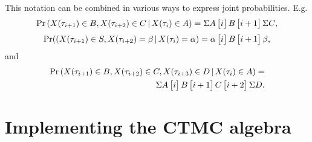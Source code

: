 This notation can be combined in various ways to express joint probabilities. E.g.
\[
    \Pr\left( X(\tau_{i+1})\in B, X(\tau_{i+2})\in C \,|\, X(\tau_i)\in A \right)
    = {\Sigma A}\,\mathbf{\big[}i\mathbf{\big]}\,B\,\mathbf{\big[}i+1\mathbf{\big]}\,{\Sigma C}
    ,
\]
\[
    \Pr(\left( X(\tau_{i+1})\in S, X(\tau_{i+2})=\beta \,|\, X(\tau_i)=\alpha \right)
    = \alpha\,\mathbf{\big[}i\mathbf{\big]}\,B\,\mathbf{\big[}i+1\mathbf{\big]}\,\beta,
\]
and
\begin{eqnarray*}
    \Pr\left(X(\tau_{i+1})\in B, X(\tau_{i+2})\in C, X(\tau_{i+3})\in D \,|\, X(\tau_i)\in A\right)
    = \\{\Sigma A}\,\mathbf{\big[}i\mathbf{\big]}\,B\,\mathbf{\big[}i+1\mathbf{\big]}\,C\,\mathbf{\big[}i+2\mathbf{\big]}\,{\Sigma D}
    .
\end{eqnarray*}

\section{Implementing the CTMC algebra}

